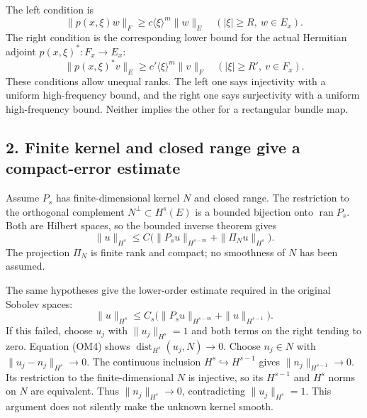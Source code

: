 \documentclass[
  11pt,
]{article}
\makeatletter
\let\ReaderOriginalAnchorStart\hyper@anchorstart
\let\ReaderOriginalAnchorEnd\hyper@anchorend
\let\ReaderPendingAliases\@empty
\def\ReaderArmAliases#1{\gdef\ReaderPendingAliases{#1}}
\def\hyper@anchorstart#1{\ReaderIfNativeAnchorTF{#1}{\ReaderPendingAliases\global\let\ReaderPendingAliases\@empty}{}\ReaderOriginalAnchorStart{#1}}
\makeatother
\begin{document}
The left condition is \[
 \|p(x,\xi)w\|_F\ge c\langle\xi\rangle^m\|w\|_E
 \quad (|\xi|\ge R,\ w\in E_x).
 \tag{OM2}
\] The right condition is the corresponding lower bound for the actual
Hermitian adjoint \(p(x,\xi)^*:F_x\to E_x\): \[
 \|p(x,\xi)^*v\|_E\ge c'\langle\xi\rangle^m\|v\|_F
 \quad (|\xi|\ge R',\ v\in F_x).
 \tag{OM3}
\] These conditions allow unequal ranks. The left one says injectivity
with a uniform high-frequency bound, and the right one says surjectivity
with a uniform high-frequency bound. Neither implies the other for a
rectangular bundle map.

\ReaderArmAliases{\ReaderOriginalAnchorStart{AN03-OMF-002}\ReaderOriginalAnchorEnd\begingroup\expandafter\def\csname @currentHref\endcsname{AN03-OMF-002}\label{AN03-OMF-002}\endgroup\ReaderOriginalAnchorStart{2-finite-kernel-and-closed-range-give-a-compact-error-estimate}\ReaderOriginalAnchorEnd\begingroup\expandafter\def\csname @currentHref\endcsname{2-finite-kernel-and-closed-range-give-a-compact-error-estimate}\label{2-finite-kernel-and-closed-range-give-a-compact-error-estimate}\endgroup}
\subsection{2. Finite kernel and closed range give a compact-error
estimate}\label{finite-kernel-and-closed-range-give-a-compact-error-estimate}

Assume \(P_s\) has finite-dimensional kernel \(N\) and closed range. The
restriction to the orthogonal complement \(N^\perp\subset H^s(E)\) is a
bounded bijection onto \(\operatorname{ran}P_s\). Both are Hilbert
spaces, so the bounded inverse theorem gives \[
 \|u\|_{H^s}
 \le C\bigl(\|P_su\|_{H^{s-m}}+\|\Pi_Nu\|_{H^s}\bigr).
 \tag{OM4}
\] The projection \(\Pi_N\) is finite rank and compact; no smoothness of
\(N\) has been assumed.

The same hypotheses give the lower-order estimate required in the
original Sobolev spaces: \[
 \|u\|_{H^s}
 \le C_s\bigl(\|P_su\|_{H^{s-m}}+\|u\|_{H^{s-1}}\bigr).
 \tag{OM5}
\] If this failed, choose \(u_j\) with \(\|u_j\|_{H^s}=1\) and both
terms on the right tending to zero. Equation (OM4) shows
\(\operatorname{dist}_{H^s}(u_j,N)\to0\). Choose \(n_j\in N\) with
\(\|u_j-n_j\|_{H^s}\to0\). The continuous inclusion
\(H^s\hookrightarrow H^{s-1}\) gives \(\|n_j\|_{H^{s-1}}\to0\). Its
restriction to the finite-dimensional \(N\) is injective, so its
\(H^{s-1}\) and \(H^s\) norms on \(N\) are equivalent. Thus
\(\|n_j\|_{H^s}\to0\), contradicting \(\|u_j\|_{H^s}=1\). This argument
does not silently make the unknown kernel smooth.
\end{document}
